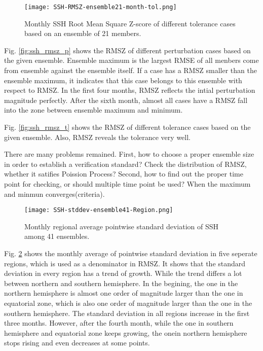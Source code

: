 \documentclass{sig-alternate}
\begin{document}
\begin{figure}
\begin{center}
\texttt{[image: SSH-RMSZ-ensemble21-month-tol.png]}
\end{center}
\caption[] {Monthly SSH Root Mean Square Z-score of different tolerance cases based on an ensemble of 21 members.}
\label{fig:ssh_rmsz_t21}
\end{figure}
Fig. \ref{fig:ssh_rmsz_p} shows the RMSZ of different perturbation cases based on the given ensemble. Ensemble maximum is the largest RMSE of all menbers come from ensemble  against the ensemble itself. If a case has a RMSZ smaller than the ensemble maximum, it indicates that this case belongs to this ensemble with respect to RMSZ. In the first four months, RMSZ reflects the intial perturbation magnitude perfectly. After the sixth month, almost all cases have a RMSZ fall into the zone between ensemble maximum and minimum. 

Fig. \ref{fig:ssh_rmsz_t} shows the RMSZ of different tolerance cases based on the given ensemble. Also, RMSZ reveals the tolerance very well. 


There are many problems remained. First, how to choose a proper ensemble size in order to establish a verification standard? Check the distribution of RMSZ, whether it satifies Poission Process? 
Second,  how to find out the proper time point for checking, or should multiple time point be used? When the maximum and minmun converges(criteria).

\begin{figure}
\begin{center}
\texttt{[image: SSH-stddev-ensemble41-Region.png]}
\end{center}
\caption[] {Monthly regional average pointwise standard deviation of SSH among 41 ensembles.}
\label{fig:monthly_std}
\end{figure}
Fig. \ref{fig:monthly_std} shows the monthly average of pointwise standard deviation in five seperate regions, which is used as a denominator in RMSZ. 
It shows that the standard deviation in every region has a trend of growth. While the trend differs a lot between northern and southern hemisphere. 
In the begining, the one in the northern hemisphere is almost one order of magnitude larger than the one in equatorial zone, which is also one order of magnitude larger than the one in the southern hemisphere. 
The standard deviation in all regions increase in the first three months. 
However, after the fourth month, while the one in southern hemisphere and equatorial zone keeps growing, the onein northern hemisphere stops rising and even decreases at some points. 
\end{document}
